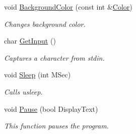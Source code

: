 \begin{DoxyCompactItemize}
void \hyperlink{namespace_chase_game_ad2dbfd93f4fd5725ab396d5dfa78a0c4}{Background\-Color} (const int \&\hyperlink{namespace_chase_game_a3a120300b1e200a26fe8680a33300283}{Color})
\begin{DoxyCompactList}\small\item\em Changes background color. \end{DoxyCompactList}\item 
char \hyperlink{namespace_chase_game_afa8eec677de5433e0e886da19f7e9c4a}{Get\-Input} ()
\begin{DoxyCompactList}\small\item\em Captures a character from stdin. \end{DoxyCompactList}\item 
void \hyperlink{namespace_chase_game_a8ca147721cdfaf96ee1f9c5007c27142}{Sleep} (int M\-Sec)
\begin{DoxyCompactList}\small\item\em Calls usleep. \end{DoxyCompactList}\item 
void \hyperlink{namespace_chase_game_a944f872ea6d98761b645f2b7d7cad8fa}{Pause} (bool Display\-Text)
\begin{DoxyCompactList}\small\item\em This function pauses the program. \end{DoxyCompactList}\end{DoxyCompactItemize}

